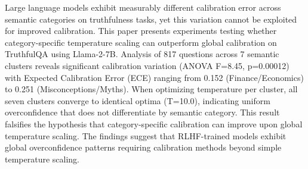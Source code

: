 
Large language models exhibit measurably different calibration error across semantic categories on truthfulness tasks, yet this variation cannot be exploited for improved calibration. This paper presents experiments testing whether category-specific temperature scaling can outperform global calibration on TruthfulQA using Llama-2-7B. Analysis of 817 questions across 7 semantic clusters reveals significant calibration variation (ANOVA F=8.45, p=0.00012) with Expected Calibration Error (ECE) ranging from 0.152 (Finance/Economics) to 0.251 (Misconceptions/Myths). When optimizing temperature per cluster, all seven clusters converge to identical optima (T=10.0), indicating uniform overconfidence that does not differentiate by semantic category. This result falsifies the hypothesis that category-specific calibration can improve upon global temperature scaling. The findings suggest that RLHF-trained models exhibit global overconfidence patterns requiring calibration methods beyond simple temperature scaling.

